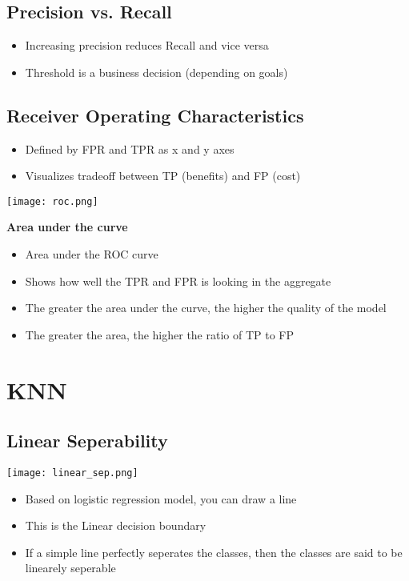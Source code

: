 \subsection{Precision vs. Recall}
\begin{itemize}
    \item Increasing precision reduces Recall and vice versa
    \item Threshold is a business decision (depending on goals)
\end{itemize}

\subsection{Receiver Operating Characteristics}
\begin{itemize}
    \item Defined by FPR and TPR as x and y axes
    \item Visualizes tradeoff between TP (benefits) and FP (cost)
\end{itemize}
\begin{center}
    \texttt{[image: roc.png]}
\end{center}
\textbf{Area under the curve}
\begin{itemize}
    \item Area under the ROC curve
    \item Shows how well the TPR and FPR is looking in the aggregate
    \item The greater the area under the curve, the higher the quality of the model
    \item The greater the area, the higher the ratio of TP to FP
\end{itemize}

\section{KNN}
\subsection{Linear Seperability}
\texttt{[image: linear\_sep.png]}

\begin{itemize}
    \item Based on logistic regression model, you can draw a line
    \item This is the Linear decision boundary
    \item If a simple line perfectly seperates the classes, then the classes are said to be linearely seperable
\end{itemize}

